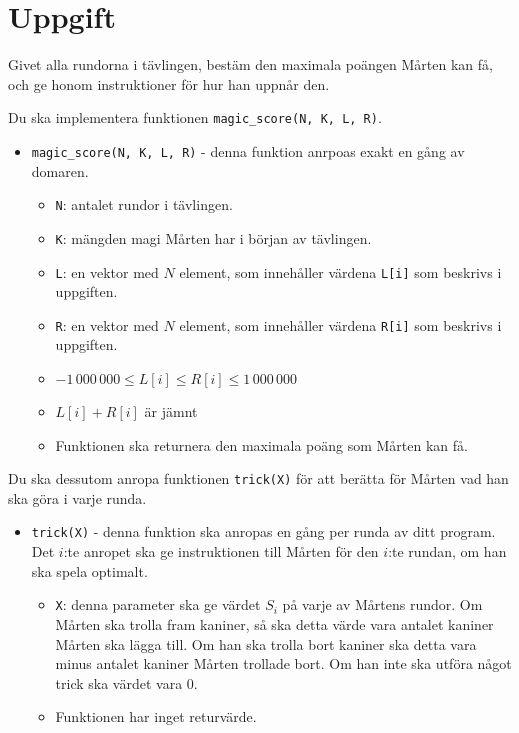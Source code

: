 \section*{Uppgift}
Givet alla rundorna i tävlingen, bestäm den maximala poängen Mårten kan få, och
ge honom instruktioner för hur han uppnår den.

Du ska implementera funktionen \texttt{magic\_score(N, K, L, R)}.
\begin{itemize}
  \item \texttt{magic\_score(N, K, L, R)} - denna funktion anrpoas exakt en gång av domaren.
  \begin{itemize}
    \item \texttt{N}: antalet rundor i tävlingen.
    \item \texttt{K}: mängden magi Mårten har i början av tävlingen.
    \item \texttt{L}: en vektor med $N$ element, som innehåller värdena \texttt{L[i]} som beskrivs i uppgiften.
    \item \texttt{R}: en vektor med $N$ element, som innehåller värdena \texttt{R[i]} som beskrivs i uppgiften.
    \item $-1\,000\,000 \le L[i] \le R[i] \le 1\,000\,000$
    \item $L[i] + R[i]$ är jämnt
    \item Funktionen ska returnera den maximala poäng som Mårten kan få.
  \end{itemize}

\end{itemize}

Du ska dessutom anropa funktionen \texttt{trick(X)} för att berätta för Mårten vad han ska göra i varje runda.
\begin{itemize}
  \item \texttt{trick(X)} - denna funktion ska anropas en gång per runda av ditt program.
    Det $i$:te anropet ska ge instruktionen till Mårten för den $i$:te rundan, om han ska spela optimalt.
  \begin{itemize}
    \item \texttt{X}: denna parameter ska ge värdet $S_i$ på varje av Mårtens rundor.
      Om Mårten ska trolla fram kaniner,
      så ska detta värde vara antalet kaniner Mårten ska lägga till. Om han ska trolla bort kaniner ska detta vara minus antalet kaniner Mårten trollade bort. 
      Om han inte ska utföra något trick ska värdet vara $0$.
    \item Funktionen har inget returvärde.
  \end{itemize}
\end{itemize}

